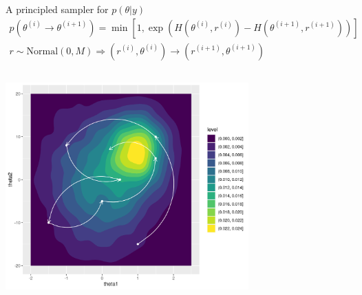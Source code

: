 \documentclass[bigger]{beamer}
\begin{document}
\begin{frame}[label={sec:org6adaad4}]{A principled sampler for \(p(\theta|y)\)}
\begin{align*}
  p(\theta^{(i)} \rightarrow \theta^{(i+1)}) =\min\left[
    1, \exp{(H(\theta^{(i)}, r^{(i)}) - H(\theta^{(i+1)}, r^{(i+1)}))}
  \right]\\
  r \sim \text{Normal}(0, M) \Longrightarrow
  (r^{(i)}, \theta^{(i)}) \rightarrow (r^{(i+1)}, \theta^{(i+1)})
\end{align*}
\begin{columns}
\begin{column}{0.7\columnwidth}
\begin{center}
\includegraphics[width=0.7\textwidth]{./figure/sampler_path.png}
\end{center}
\end{column}


\end{columns}
\end{frame}
\end{document}
